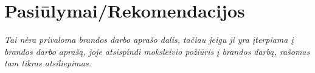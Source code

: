 \newpage
\section{Pasiūlymai/Rekomendacijos}
\textit{Tai nėra privaloma brandos darbo aprašo dalis, tačiau jeigu ji yra įterpiama į brandos darbo aprašą, joje atsispindi moksleivio požiūris į brandos darbą, rašomas tam tikras atsiliepimas.}
\lipsum[7]
